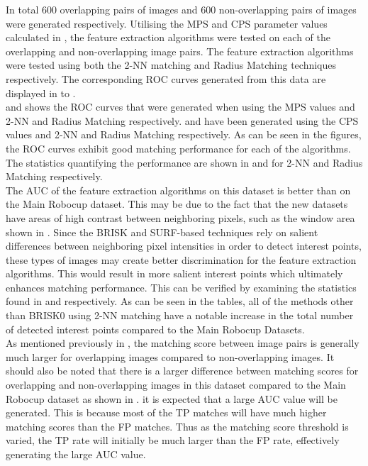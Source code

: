 \documentclass{report}
\begin{document}
In total $600$ overlapping pairs of images and $600$ non-overlapping pairs of images were generated respectively. Utilising the MPS and CPS parameter values calculated in , the feature extraction algorithms were tested on each of the overlapping and non-overlapping image pairs. The feature extraction algorithms were tested using both the 2-NN matching and Radius Matching techniques respectively. The corresponding ROC curves generated from this data are displayed in  to . \\

 and  shows the ROC curves that were generated when using the MPS values and 2-NN and Radius Matching respectively.  and  have been generated using the CPS values and 2-NN and Radius Matching respectively. As can be seen in the figures, the ROC curves exhibit good matching performance for each of the algorithms. The statistics quantifying the performance are shown in  and  for 2-NN and Radius Matching respectively. \\

The AUC of the feature extraction algorithms on this dataset is better than on the Main Robocup dataset. This may be due to the fact that the new datasets have areas of high contrast between neighboring pixels, such as the window area shown in . Since the BRISK and SURF-based techniques rely on salient differences between neighboring pixel intensities in order to detect interest points, these types of images may create better discrimination for the feature extraction algorithms. This would result in more salient interest points which ultimately enhances matching performance. This can be verified by examining the statistics found in  and  respectively. As can be seen in the tables, all of the methods other than BRISK0 using 2-NN matching have a notable increase in the total number of detected interest points compared to the Main Robocup Datasets.\\

As mentioned previously in , the matching score between image pairs is generally much larger for overlapping images compared to non-overlapping images. It should also be noted that there is a larger difference between matching scores for overlapping and non-overlapping images in this dataset compared to the Main Robocup dataset as shown in . it is expected that a large AUC value will be generated. This is because most of the TP matches will have much higher matching scores than the FP matches. Thus as the matching score threshold is varied, the TP rate will initially be much larger than the FP rate, effectively generating the large AUC value. \\
\end{document}
